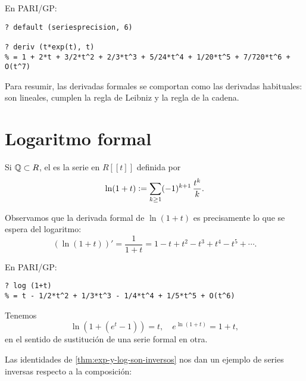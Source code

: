 \documentclass{article}
\numberwithin{equation}{section}
\theoremstyle{definition}
\newtheorem{ejercicio}{Ejercicio}
\begin{document}
\begin{shaded}
  \noindent\small En PARI/GP:

\begin{verbatim}
? default (seriesprecision, 6)

? deriv (t*exp(t), t)         
% = 1 + 2*t + 3/2*t^2 + 2/3*t^3 + 5/24*t^4 + 1/20*t^5 + 7/720*t^6 + O(t^7)
\end{verbatim}
\end{shaded}

Para resumir, las derivadas formales se comportan como las derivadas habituales:
son lineales, cumplen la regla de Leibniz y la regla de la cadena.


\section{Logaritmo formal}

\begin{definicion}
  Si $\mathbb{Q} \subset R$, el  es la serie en $R [\![t]\!]$
  definida por
  $$\ln (1 + t) \mathrel{\mathop:}= \sum_{k\ge 1} (-1)^{k+1}\,\frac{t^k}{k}.$$
\end{definicion}

Observamos que la derivada formal de $\ln (1+t)$ es precisamente lo que se
espera del logaritmo:
$$(\ln (1+t))' = \frac{1}{1+t} = 1 - t + t^2 - t^3 + t^4 - t^5 + \cdots.$$

\begin{shaded}
  \noindent\small En PARI/GP:

\begin{verbatim}
? log (1+t)
% = t - 1/2*t^2 + 1/3*t^3 - 1/4*t^4 + 1/5*t^5 + O(t^6)
\end{verbatim}
\end{shaded}

\begin{teorema}
  \label{thm:exp-y-log-son-inversos}
  Tenemos
  $$\ln (1 + (e^t - 1)) = t, \quad e^{\ln (1 + t)} = 1 + t,$$
  en el sentido de sustitución de una serie formal en otra.
\end{teorema}


Las identidades de \ref{thm:exp-y-log-son-inversos} nos dan un ejemplo de series
inversas respecto a la composición:
\end{document}
